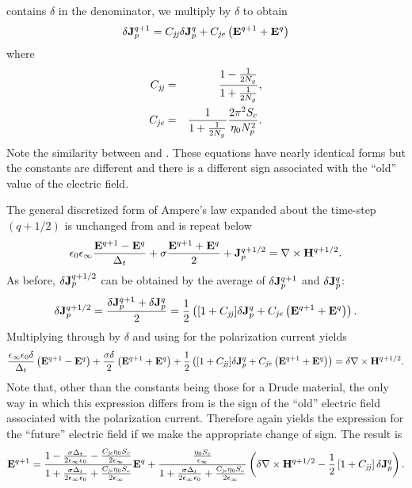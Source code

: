 contains $\delta$ in the denominator, we multiply
 by $\delta$ to obtain
\begin{equation}
  \delta\mathbf{J}_p^{q+1} = C_{\mathit{jj}}\delta\mathbf{J}_p^q
  +C_{\mathit{je}}\left(\mathbf{E}^{q+1}+\mathbf{E}^q\right)
  \label{eq:jpUpdateDrudeI}
\end{equation}
where
\begin{eqnarray}
  C_{\mathit{jj}} &=& \frac{1-\frac{1}{2N_g}}{1+\frac{1}{2N_g}},  \\
  C_{\mathit{je}} &=& \frac{1}{1+\frac{1}{2N_g}}\frac{2\pi^2 S_c}{\eta_0 N_p^2}.
\end{eqnarray}
Note the similarity between  and
.  These equations have nearly identical
forms but the constants are different and there is a different sign
associated with the ``old'' value of the electric field.

The general discretized form of Ampere's law expanded about the
time-step $(q+1/2)$ is unchanged from  and is
repeat below
\begin{equation}
 \epsilon_0\epsilon_\infty \frac{\mathbf{E}^{q+1}-\mathbf{E}^q}{\Delta_t}
 +\sigma\frac{\mathbf{E}^{q+1}+\mathbf{E}^q}{2}+\mathbf{J}_p^{q+1/2} =
	\nabla\times\mathbf{H}^{q+1/2}.
\end{equation}
As before, $\delta\mathbf{J}_p^{q+1/2}$ can be obtained by the average of
$\delta\mathbf{J}_p^{q+1}$ and $\delta\mathbf{J}_p^{q}$:
\begin{equation}
  \delta\mathbf{J}_p^{q+1/2} =
  \frac{\delta\mathbf{J}_p^{q+1}+\delta\mathbf{J}_p^{q}}{2} = 
    \frac{1}{2}\left([1+C_{\mathit{jj}}]\delta\mathbf{J}_p^q +
    C_{\mathit{je}}\left(\mathbf{E}^{q+1}+\mathbf{E}^q\right)\right).
  \label{eq:jpDrudeHalf}
\end{equation}
Multiplying through by $\delta$ and using  for
the polarization current yields
\begin{equation}
 \frac{\epsilon_\infty\epsilon_0\delta}{\Delta_t} 
 \left(\mathbf{E}^{q+1}-\mathbf{E}^q\right)
 + \frac{\sigma\delta}{2}\left(\mathbf{E}^{q+1}+\mathbf{E}^q\right)
 + \frac{1}{2}\left([1+C_{\mathit{jj}}]\delta\mathbf{J}_p^q +
     C_{\mathit{je}}\left(\mathbf{E}^{q+1}+\mathbf{E}^q\right)\right)=
	\delta\nabla\times\mathbf{H}^{q+1/2}.
\end{equation}
Note that, other than the constants being those for a Drude material,
the only way in which this expression differs from
 is the sign of the ``old'' electric
field associated with the polarization current.  Therefore
 again yields the expression for the
``future'' electric field if we make the appropriate change of sign.
The result is
\begin{equation}
 \mathbf{E}^{q+1}=
  \frac{1 - \frac{\sigma\Delta_t}{2\epsilon_\infty\epsilon_0}
          - \frac{C_{\mathit{je}}\eta_0 S_c}{2\epsilon_\infty}}
       {1 + \frac{\sigma\Delta_t}{2\epsilon_\infty\epsilon_0}
          + \frac{C_{\mathit{je}}\eta_0 S_c}{2\epsilon_\infty}}
 \mathbf{E}^q
 +  \frac{\frac{\eta_0 S_c}{\epsilon_\infty}}{1
                   + \frac{\sigma\Delta_t}{2\epsilon_\infty\epsilon_0}
                   + \frac{C_{\mathit{je}}\eta_0 S_c}{2\epsilon_\infty}}
\left(\delta\nabla\times\mathbf{H}^{q+1/2} -
 \frac{1}{2}\left[1+C_{\mathit{jj}}\right]\delta\mathbf{J}_p^q\right).
\label{eq:eUpdateDrude}
\end{equation}

